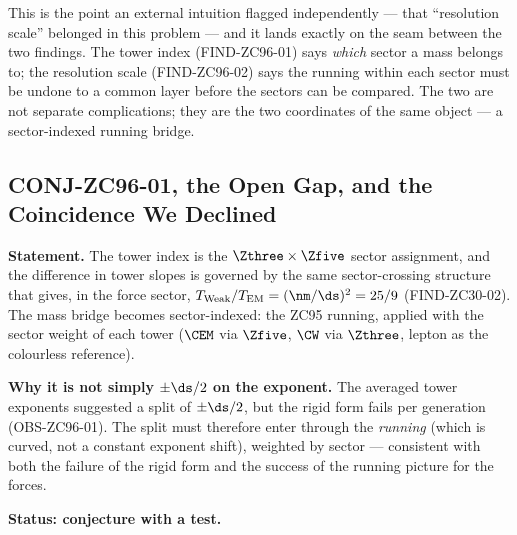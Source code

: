 \documentclass[12pt, a4paper]{article}
\begin{document}
This is the point an external intuition flagged independently --- that
``resolution scale'' belonged in this problem --- and it lands exactly on the
seam between the two findings. The tower index (FIND-ZC96-01) says \emph{which}
sector a mass belongs to; the resolution scale (FIND-ZC96-02) says the running
within each sector must be undone to a common layer before the sectors can be
compared. The two are not separate complications; they are the two coordinates
of the same object --- a sector-indexed running bridge.


\subsection{CONJ-ZC96-01, the Open Gap, and the Coincidence We Declined}
\label{sec:conj-gap-zc96}

\begin{openqbox}[title={CONJ-ZC96-01: The Tower Split Rides the
  Sector-Crossing Ratio}]
\textbf{Statement.} The tower index is the $\Zthree\times\Zfive$ sector
assignment, and the difference in tower slopes is governed by the same
sector-crossing structure that gives, in the force sector,
$T_{\mathrm{Weak}}/T_{\mathrm{EM}}=(\nm/\ds)^2=25/9$ (FIND-ZC30-02). The mass
bridge becomes sector-indexed: the ZC95 running, applied with the sector weight
of each tower ($\CEM$ via $\Zfive$, $\CW$ via $\Zthree$, lepton as the
colourless reference).

\textbf{Why it is not simply $\pm\ds/2$ on the exponent.} The averaged tower
exponents suggested a split of $\pm\ds/2$, but the rigid form fails per
generation (OBS-ZC96-01). The split must therefore enter through the
\emph{running} (which is curved, not a constant exponent shift), weighted by
sector --- consistent with both the failure of the rigid form and the success
of the running picture for the forces.

\textbf{Status: conjecture with a test.}
\end{openqbox}
\end{document}

